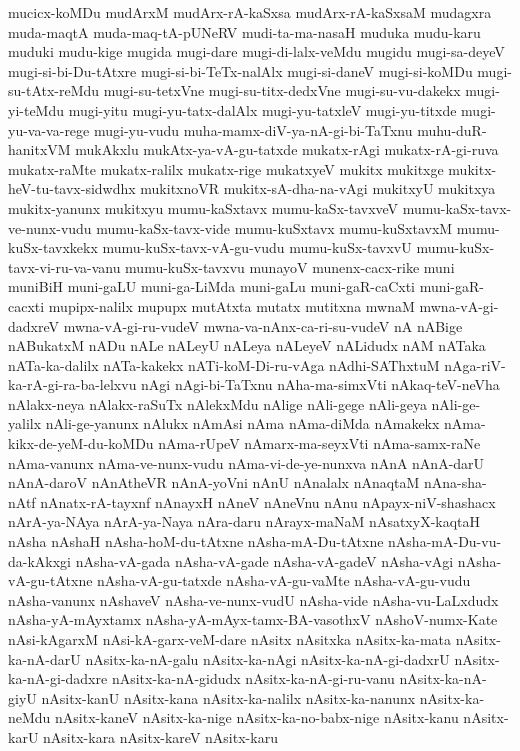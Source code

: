 {mucicx-koMDu
mudArxM
mudArx-rA-kaSxsa
mudArx-rA-kaSxsaM
mudagxra
muda-maqtA
muda-maq-tA-pUNeRV
mudi-ta-ma-nasaH
muduka
mudu-karu
muduki
mudu-kige
mugida
mugi-dare
mugi-di-lalx-veMdu
mugidu
mugi-sa-deyeV
mugi-si-bi-Du-tAtxre
mugi-si-bi-TeTx-nalAlx
mugi-si-daneV
mugi-si-koMDu
mugi-su-tAtx-reMdu
mugi-su-tetxVne
mugi-su-titx-dedxVne
mugi-su-vu-dakekx
mugi-yi-teMdu
mugi-yitu
mugi-yu-tatx-dalAlx
mugi-yu-tatxleV
mugi-yu-titxde
mugi-yu-va-va-rege
mugi-yu-vudu
muha-mamx-diV-ya-nA-gi-bi-TaTxnu
muhu-duR-hanitxVM
mukAkxlu
mukAtx-ya-vA-gu-tatxde
mukatx-rAgi
mukatx-rA-gi-ruva
mukatx-raMte
mukatx-ralilx
mukatx-rige
mukatxyeV
mukitx
mukitxge
mukitx-heV-tu-tavx-sidwdhx
mukitxnoVR
mukitx-sA-dha-na-vAgi
mukitxyU
mukitxya
mukitx-yanunx
mukitxyu
mumu-kaSxtavx
mumu-kaSx-tavxveV
mumu-kaSx-tavx-ve-nunx-vudu
mumu-kaSx-tavx-vide
mumu-kuSxtavx
mumu-kuSxtavxM
mumu-kuSx-tavxkekx
mumu-kuSx-tavx-vA-gu-vudu
mumu-kuSx-tavxvU
mumu-kuSx-tavx-vi-ru-va-vanu
mumu-kuSx-tavxvu
munayoV
munenx-cacx-rike
muni
muniBiH
muni-gaLU
muni-ga-LiMda
muni-gaLu
muni-gaR-caCxti
muni-gaR-cacxti
mupipx-nalilx
mupupx
mutAtxta
mutatx
mutitxna
mwnaM
mwna-vA-gi-dadxreV
mwna-vA-gi-ru-vudeV
mwna-va-nAnx-ca-ri-su-vudeV
nA
nABige
nABukatxM
nADu
nALe
nALeyU
nALeya
nALeyeV
nALidudx
nAM
nATaka
nATa-ka-dalilx
nATa-kakekx
nATi-koM-Di-ru-vAga
nAdhi-SAThxtuM
nAga-riV-ka-rA-gi-ra-ba-lelxvu
nAgi
nAgi-bi-TaTxnu
nAha-ma-simxVti
nAkaq-teV-neVha
nAlakx-neya
nAlakx-raSuTx
nAlekxMdu
nAlige
nAli-gege
nAli-geya
nAli-ge-yalilx
nAli-ge-yanunx
nAlukx
nAmAsi
nAma
nAma-diMda
nAmakekx
nAma-kikx-de-yeM-du-koMDu
nAma-rUpeV
nAmarx-ma-seyxVti
nAma-samx-raNe
nAma-vanunx
nAma-ve-nunx-vudu
nAma-vi-de-ye-nunxva
nAnA
nAnA-darU
nAnA-daroV
nAnAtheVR
nAnA-yoVni
nAnU
nAnalalx
nAnaqtaM
nAna-sha-nAtf
nAnatx-rA-tayxnf
nAnayxH
nAneV
nAneVnu
nAnu
nApayx-niV-shashacx
nArA-ya-NAya
nArA-ya-Naya
nAra-daru
nArayx-maNaM
nAsatxyX-kaqtaH
nAsha
nAshaH
nAsha-hoM-du-tAtxne
nAsha-mA-Du-tAtxne
nAsha-mA-Du-vu-da-kAkxgi
nAsha-vA-gada
nAsha-vA-gade
nAsha-vA-gadeV
nAsha-vAgi
nAsha-vA-gu-tAtxne
nAsha-vA-gu-tatxde
nAsha-vA-gu-vaMte
nAsha-vA-gu-vudu
nAsha-vanunx
nAshaveV
nAsha-ve-nunx-vudU
nAsha-vide
nAsha-vu-LaLxdudx
nAsha-yA-mAyxtamx
nAsha-yA-mAyx-tamx-BA-vasothxV
nAshoV-numx-Kate
nAsi-kAgarxM
nAsi-kA-garx-veM-dare
nAsitx
nAsitxka
nAsitx-ka-mata
nAsitx-ka-nA-darU
nAsitx-ka-nA-galu
nAsitx-ka-nAgi
nAsitx-ka-nA-gi-dadxrU
nAsitx-ka-nA-gi-dadxre
nAsitx-ka-nA-gidudx
nAsitx-ka-nA-gi-ru-vanu
nAsitx-ka-nA-giyU
nAsitx-kanU
nAsitx-kana
nAsitx-ka-nalilx
nAsitx-ka-nanunx
nAsitx-ka-neMdu
nAsitx-kaneV
nAsitx-ka-nige
nAsitx-ka-no-babx-nige
nAsitx-kanu
nAsitx-karU
nAsitx-kara
nAsitx-kareV
nAsitx-karu
}
